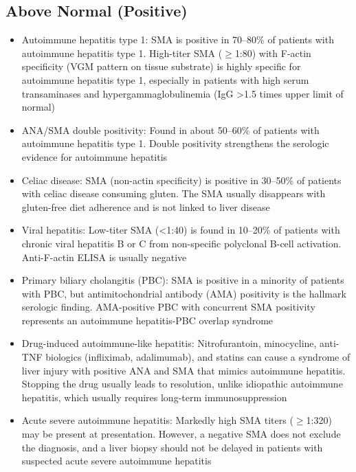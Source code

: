 \subsection*{Above Normal (Positive)}
\begin{itemize}
  \item Autoimmune hepatitis type 1: SMA is positive in 70--80\% of patients with autoimmune hepatitis type 1. High-titer SMA ($\geq$1:80) with F-actin specificity (VGM pattern on tissue substrate) is highly specific for autoimmune hepatitis type 1, especially in patients with high serum transaminases and hypergammaglobulinemia (IgG >1.5 times upper limit of normal)
  \item ANA/SMA double positivity: Found in about 50--60\% of patients with autoimmune hepatitis type 1. Double positivity strengthens the serologic evidence for autoimmune hepatitis
  \item Celiac disease: SMA (non-actin specificity) is positive in 30--50\% of patients with celiac disease consuming gluten. The SMA usually disappears with gluten-free diet adherence and is not linked to liver disease
  \item Viral hepatitis: Low-titer SMA (<1:40) is found in 10--20\% of patients with chronic viral hepatitis B or C from non-specific polyclonal B-cell activation. Anti-F-actin ELISA is usually negative
  \item Primary biliary cholangitis (PBC): SMA is positive in a minority of patients with PBC, but antimitochondrial antibody (AMA) positivity is the hallmark serologic finding. AMA-positive PBC with concurrent SMA positivity represents an autoimmune hepatitis-PBC overlap syndrome
  \item Drug-induced autoimmune-like hepatitis: Nitrofurantoin, minocycline, anti-TNF biologics (infliximab, adalimumab), and statins can cause a syndrome of liver injury with positive ANA and SMA that mimics autoimmune hepatitis. Stopping the drug usually leads to resolution, unlike idiopathic autoimmune hepatitis, which usually requires long-term immunosuppression
  \item Acute severe autoimmune hepatitis: Markedly high SMA titers ($\geq$1:320) may be present at presentation. However, a negative SMA does not exclude the diagnosis, and a liver biopsy should not be delayed in patients with suspected acute severe autoimmune hepatitis
\end{itemize}

